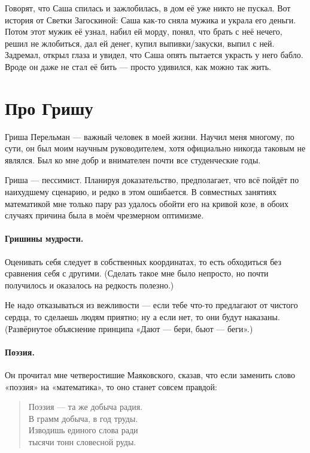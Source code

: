 \documentclass{book}
\begin{document}
Говорят, что Саша спилась и зажлобилась, в дом её уже никто не пускал.
Вот история от Светки Загоскиной:
Саша как-то сняла мужика и украла его деньги.
Потом этот мужик её узнал, набил ей морду, понял, что брать с неё нечего, решил не жлобиться, дал ей денег, купил выпивки/закуски, выпил с ней.
Задремал, открыл глаза и увидел, что Саша опять пытается украсть у него бабло.
Вроде он даже не стал её бить --- просто удивился, как можно так жить.

\section*{Про Гришу}

Гриша Перельман --- важный человек в моей жизни.
Научил меня многому, по сути, он был моим научным руководителем, хотя официально никогда таковым не являлся.
Был ко мне добр и внимателен почти все студенческие годы.

Гриша --- пессимист.
Планируя доказательство, предполагает, что всё пойдёт по наихудшему сценарию, и редко в этом ошибается.
В совместных занятиях математикой мне только пару раз удалось обойти его на кривой козе, в обоих случаях причина была в моём чрезмерном оптимизме.

\paragraph{Гришины мудрости.}
Оценивать себя следует в собственных координатах, то есть обходиться без сравнения себя с другими.
(Сделать такое мне было непросто, но почти получилось и оказалось на редкость полезно.)

Не надо отказываться из вежливости  --- если тебе что-то предлагают от чистого сердца, то сделаешь людям приятно; ну а если нет, то они будут наказаны.
(Развёрнутое объяснение принципа «Дают --- бери, бьют --- беги».)

\paragraph{Поэзия.}
Он прочитал мне четверостишие Маяковского,
сказав, что если заменить слово «поэзия» на «математика», то оно станет совсем правдой: 
\begin{verse}
Поэзия — та же добыча радия.\\
В грамм добыча, в год труды.\\
Изводишь единого слова ради\\
тысячи тонн словесной руды.\\
\end{verse}
\end{document}

